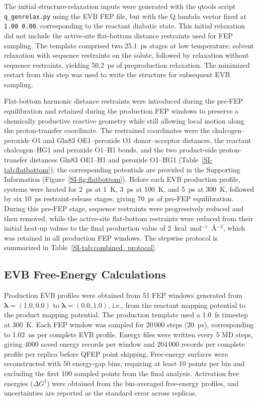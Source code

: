 The initial structure-relaxation inputs were generated with the qtools script \texttt{q\_genrelax.py}\cite{PurgBauer2017Qtools} using the EVB FEP file, but with the Q lambda vector fixed at \texttt{1.00 0.00}, corresponding to the reactant diabatic state. This initial relaxation did not include the active-site flat-bottom distance restraints used for FEP sampling. The template comprised two 25.1~ps stages at low temperature: solvent relaxation with sequence restraints on the solute, followed by relaxation without sequence restraints, yielding 50.2~ps of preproduction relaxation. The minimized restart from this step was used to write the structure for subsequent EVB sampling.

Flat-bottom harmonic distance restraints were introduced during the pre-FEP equilibration and retained during the production FEP windows to preserve a chemically productive reactive geometry while still allowing local motion along the proton-transfer coordinate.  The restrained coordinates were the chalcogen--peroxide O1 and Gln83 OE1--peroxide O1 donor--acceptor distances, the reactant chalcogen--HG1 and peroxide O1--H1 bonds, and the two product-side proton-transfer distances Gln83 OE1--H1 and peroxide O1--HG1 (Table~\ref{SI-tab:flatbottom}); the corresponding potentials are provided in the Supporting Information (Figure~\ref{SI-fig:flatbottom}). Before each EVB production profile, systems were heated for 2~ps at 1~K, 3~ps at 100~K, and 5~ps at 300~K, followed by six 10~ps restraint-release stages, giving 70~ps of pre-FEP equilibration. During this pre-FEP stage, sequence restraints were progressively reduced and then removed, while the active-site flat-bottom restraints were reduced from their initial heat-up values to the final production value of 2~kcal~mol$^{-1}$~\AA$^{-2}$, which was retained in all production FEP windows. The stepwise protocol is summarized in Table~\ref{SI-tab:combined_protocol}.

\subsection{EVB Free-Energy Calculations}

Production EVB profiles were obtained from 51 FEP windows generated from $\boldsymbol{\lambda}=(1.0,0.0)$ to $\boldsymbol{\lambda}=(0.0,1.0)$, i.e., from the reactant mapping potential to the product mapping potential. The production template used a 1.0~fs timestep at 300~K. Each FEP window was sampled for 20\,000 steps (20~ps), corresponding to 1.02~ns per complete EVB profile. Energy files were written every 5 MD steps, giving 4000 saved energy records per window and 204\,000 records per complete profile per replica before QFEP point skipping. Free-energy surfaces were reconstructed with 50 energy-gap bins, requiring at least 10 points per bin and excluding the first 100 sampled points from the final analysis. Activation free energies ($\Delta G^{\ddagger}$) were obtained from the bin-averaged free-energy profiles, and uncertainties are reported as the standard error across replicas.


